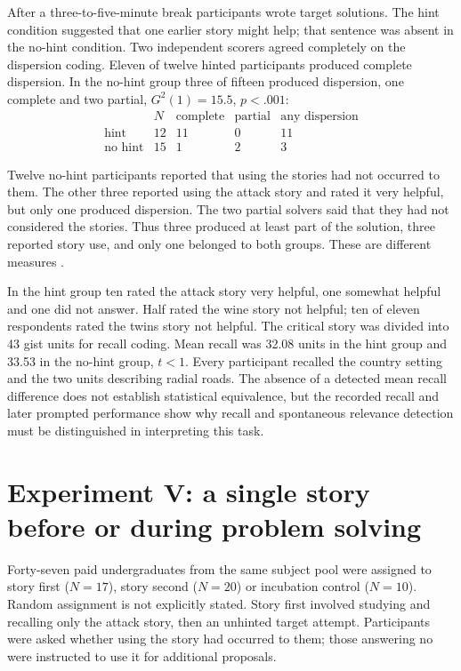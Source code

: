 After a three-to-five-minute break participants wrote
target solutions. The hint condition suggested that
one earlier story might help; that sentence was absent
in the no-hint condition. Two independent scorers
agreed completely on the dispersion coding.
Eleven of twelve hinted participants produced complete
dispersion. In the no-hint group three of fifteen
produced dispersion, one complete and two partial,
\(G^2(1)=15.5\), \(p<.001\):
\[
\begin{array}{l|r|rr|r}
 &N&\text{complete}&\text{partial}&\text{any dispersion}\\ \hline
 \text{hint}&12&11&0&11\\
 \text{no hint}&15&1&2&3
\end{array}
\]

Twelve no-hint participants reported that using the
stories had not occurred to them. The other three
reported using the attack story and rated it very
helpful, but only one produced dispersion. The two
partial solvers said that they had not considered
the stories. Thus three produced at least part of
the solution, three reported story use, and only one
belonged to both groups. These are different measures
\cite[pp.~340--343]{GickHolyoak1980AnalogicalProblemSolving}.

In the hint group ten rated the attack story very
helpful, one somewhat helpful and one did not answer.
Half rated the wine story not helpful; ten of eleven
respondents rated the twins story not helpful.
The critical story was divided into 43 gist units
for recall coding. Mean recall was 32.08 units in
the hint group and 33.53 in the no-hint group,
\(t<1\). Every participant recalled the country
setting and the two units describing radial roads.
The absence of a detected mean recall difference
does not establish statistical equivalence, but
the recorded recall and later prompted performance
show why recall and spontaneous relevance detection
must be distinguished in interpreting this task.

\section{Experiment V: a single story before or during problem solving}
\label{sec:p19-analogy-experiment-five}

Forty-seven paid undergraduates from the same subject
pool were assigned to story first (\(N=17\)), story
second (\(N=20\)) or incubation control (\(N=10\)).
Random assignment is not explicitly stated.
Story first involved studying and recalling only
the attack story, then an unhinted target attempt.
Participants were asked whether using the story had
occurred to them; those answering no were instructed
to use it for additional proposals.

